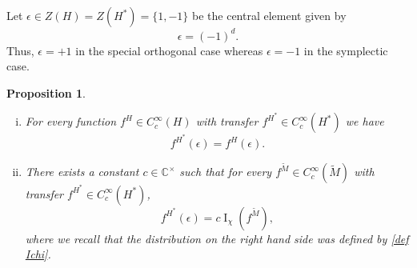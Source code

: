 \documentclass[12pt]{article}
\newtheorem{prop}{Proposition}[section]
\numberwithin{equation}{section}
\def\tM{\widetilde{M}}
\DeclareMathOperator{\rI}{\mathrm{I}}
\begin{document}
	Let $\epsilon\in Z(H)=Z(H^*)=\{ 1,-1\}$ be the central element given by
	$$\displaystyle \epsilon=(-1)^d.$$
	Thus, $\epsilon=+1$ in the special orthogonal case whereas $\epsilon=-1$ in the symplectic case.
	
	\begin{prop}\label{prop transfer dirac}
		\begin{enumerate}[(i)]
			\item For every function $f^H\in C_c^\infty(H)$ with transfer $f^{H^*}\in C_c^\infty(H^*)$ we have
			\begin{equation*}
				\displaystyle f^{H^*}(\epsilon)=f^H(\epsilon).
			\end{equation*}
		
		\item There exists a constant $c\in \mathbb{C}^\times$ such that for every $f^{\tilde{M}}\in C_c^\infty(\tilde{M})$ with transfer $f^{H^*}\in C_c^\infty(H^*)$,
		\begin{equation*}
			\displaystyle f^{H^*}(\epsilon)=c\rI_{\chi}(f^{\tM}),
		\end{equation*}
		where we recall that the distribution on the right hand side was defined by \eqref{def Ichi}.
		
	\end{enumerate}
	\end{prop}
	
\end{document}
